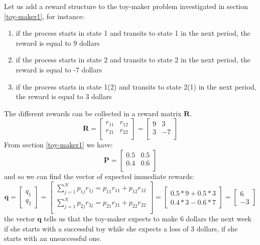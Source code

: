 \documentclass[\main/main.tex]{subfiles}
\begin{document}
\begin{small}
Let us add a reward structure to the toy-maker problem investigated in section \ref{toy-maker1}, for instance:
\begin{enumerate}
    \item if the process starts in state 1 and transits to state 1 in the next period, the reward is equal to 9 dollars
     \item if the process starts in state 2 and transits to state 2 in the next period, the reward is equal to -7 dollars
      \item if the process starts in state 1(2) and transits to state 2(1) in the next period, the reward is equal to 3 dollars
\end{enumerate}
The different rewards can be collected in a reward matrix $\mathbf{R}$.
\begin{equation}
\mathbf{R} = 
\begin{bmatrix}
r_{11} & r_{12}\\
r_{21} & r_{22}\\
\end{bmatrix} =
\begin{bmatrix}
9 & 3\\
3 & -7\\
\end{bmatrix}
\end{equation}
From section \ref{toy-maker1} we have:
\begin{equation}
\mathbf{P} = 
\begin{bmatrix}
0.5 & 0.5\\
0.4 & 0.6\\
\end{bmatrix}
\end{equation}
and so we can find the vector of expected immediate rewards:
\begin{equation}
    \mathbf{q} = 
    \begin{bmatrix}
    q_1\\
    q_2
    \end{bmatrix} =
    \begin{bmatrix}
    \sum_{j=1}^N p_{1j}r_{1j} = p_{11}r_{11} + p_{12}r_{12}\\
    \sum_{j=1}^N p_{2j}r_{2j} = p_{21}r_{21} + p_{22}r_{22}\\
    \end{bmatrix}=
     \begin{bmatrix}
    0.5*9 + 0.5*3\\
    0.4*3 - 0.6*7
    \end{bmatrix}=
     \begin{bmatrix}
    6\\
    -3
    \end{bmatrix}
\end{equation}
the vector $\mathbf{q}$ tells us that the toy-maker expects to make 6 dollars the next week if she starts with a successful toy while she expects a loss of 3 dollars, if she starts with an unsuccessful one.\\


\end{small}
\end{document}
